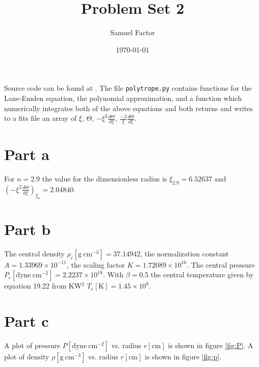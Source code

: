 \documentclass[11pt]{paper}
\title{Problem Set 2}
\author{Samuel Factor}
\date{\today}                                           %
\begin{document}
\maketitle

Source code can be found at \url{}. The file \texttt{polytrope.py} contains functions for the Lane-Emden equation, the polynomial approximation, and a function which numerically integrates both of the above equations and both returns and writes to a fits file an array of $\xi$, $\Theta$, $-\xi^2 \frac{d\Theta}{d\xi}$, $\frac{-3}{\xi}\frac{d\Theta}{d\xi}$.

\section{Part a}
For $n=2.9$ the value for the dimensionless radius is $\xi_{2.9}=6.52637$ and $(-\xi^2\frac{d\Theta}{d\xi})_{\xi_n}=2.04840$.

\section{Part b}
The central density $\rho_c [\mathrm{g~cm^{-3}}] =37.14942$, the normalization constant $A=1.33969\times10^{-11}$, the scaling factor $K=1.72089\times10^{16}$. The central pressure $P_c [\mathrm{dyne~cm^{-2}}] = 2.2237\times10^{18}$. With $\beta=0.5$ the central temperature given by equation 19.22 from KW$^2$ $T_c[\mathrm{K}]=1.45\times10^8$.

\section{Part c}
A plot of pressure $P [\mathrm{dyne~cm^{-2}}]$ vs. radius $r [\mathrm{cm}]$ is shown in figure \ref{fig:P}. A plot of density $\rho [\mathrm{g~cm^{-3}}]$ vs. radius $r [\mathrm{cm}]$ is shown in figure \ref{fig:p}.
\end{document}
